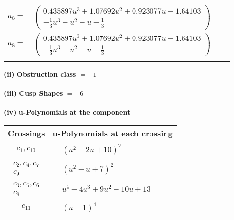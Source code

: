 \documentclass[1p]{elsarticle_modified}
\theoremstyle{definition}
\begin{document}
\begin{tabular}{m{7pt} m{180pt} m{7pt} m{180pt} }
\flushright $a_{8}=$&$\begin{pmatrix}0.435897 u^{3}+1.07692 u^{2}+0.923077 u-1.64103\\-\frac{1}{3} u^3- u^2- u-\frac{1}{3}\end{pmatrix}$\\ \flushright $a_{8}=$&$\begin{pmatrix}0.435897 u^{3}+1.07692 u^{2}+0.923077 u-1.64103\\-\frac{1}{3} u^3- u^2- u-\frac{1}{3}\end{pmatrix}$\\&\end{tabular}
\flushleft \textbf{(ii) Obstruction class $= -1$}\\~\\
\flushleft \textbf{(iii) Cusp Shapes $= -6$}\\~\\
\newpage\renewcommand{\arraystretch}{1}
\flushleft \textbf{(iv) u-Polynomials at the component}\newline \\
\begin{tabular}{m{50pt}|m{274pt}}
Crossings & \hspace{64pt}u-Polynomials at each crossing \\
\hline $$\begin{aligned}c_{1},c_{10}\end{aligned}$$&$\begin{aligned}
&(u^2-2 u+10)^2
\end{aligned}$\\
\hline $$\begin{aligned}c_{2},c_{4},c_{7}\\c_{9}\end{aligned}$$&$\begin{aligned}
&(u^2- u+7)^2
\end{aligned}$\\
\hline $$\begin{aligned}c_{3},c_{5},c_{6}\\c_{8}\end{aligned}$$&$\begin{aligned}
&u^4-4 u^3+9 u^2-10 u+13
\end{aligned}$\\
\hline $$\begin{aligned}c_{11}\end{aligned}$$&$\begin{aligned}
&(u+1)^4
\end{aligned}$\\
\hline
\end{tabular}\\~\\
\end{document}
